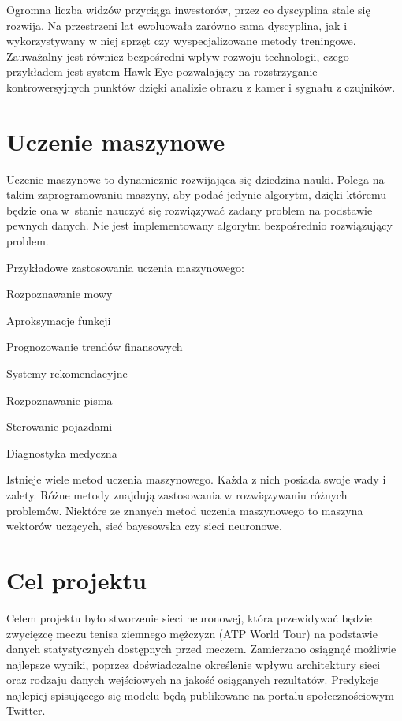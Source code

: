 Ogromna liczba widzów przyciąga inwestorów, przez co dyscyplina stale się rozwija. Na przestrzeni lat ewoluowała zarówno sama dyscyplina, jak i wykorzystywany w niej sprzęt czy wyspecjalizowane metody treningowe. Zauważalny jest również bezpośredni wpływ rozwoju technologii, czego przykładem jest system Hawk-Eye pozwalający na rozstrzyganie kontrowersyjnych punktów dzięki analizie obrazu z kamer i sygnału z czujników.



\section{Uczenie maszynowe}
\label{Sec:Machine}
Uczenie maszynowe to dynamicznie rozwijająca się dziedzina nauki. Polega na takim zaprogramowaniu maszyny, aby podać jedynie algorytm, dzięki któremu będzie ona w~stanie nauczyć się rozwiązywać zadany problem na podstawie pewnych danych. Nie jest implementowany algorytm bezpośrednio rozwiązujący problem. 

Przykładowe zastosowania uczenia maszynowego:
\begin{tightitemize}
\item Rozpoznawanie mowy
\item Aproksymacje funkcji
\item Prognozowanie trendów finansowych
\item Systemy rekomendacyjne
\item Rozpoznawanie pisma
\item Sterowanie pojazdami
\item Diagnostyka medyczna
\end{tightitemize}

Istnieje wiele metod uczenia maszynowego. Każda z nich posiada swoje wady i zalety. Różne metody znajdują zastosowania w rozwiązywaniu różnych problemów. Niektóre ze znanych metod uczenia maszynowego to maszyna wektorów uczących, sieć bayesowska czy sieci neuronowe. 

\section{Cel projektu}
\label{Sec:Goal}
Celem projektu było stworzenie sieci neuronowej, która przewidywać będzie zwycięzcę meczu tenisa ziemnego mężczyzn (ATP World Tour) na podstawie danych statystycznych dostępnych przed meczem. Zamierzano osiągnąć możliwie najlepsze wyniki, poprzez doświadczalne określenie wpływu architektury sieci oraz rodzaju danych wejściowych na jakość osiąganych rezultatów. Predykcje najlepiej spisującego się modelu będą publikowane na portalu społecznościowym Twitter.


